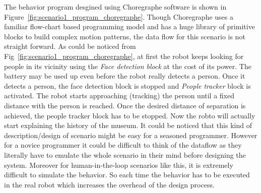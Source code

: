 The behavior program desgined using Choregraphe software is shown in Figure~\ref{fig:scenario1_program_choregraphe}. Though Choregraphe uses a familiar flow-chart based programming model and has a huge library of primitive blocks to build complex motion patterns, the data flow for this scenario is not straight forward. As could be noticed from Fig~\ref{fig:scenario1_program_choregraphe}, at first the robot keeps looking for people in its vicinity using the \emph{Face detection block} at the cost of its power. The battery may be used up even before the robot really detects a person. Once it detects a person, the face detection block is stopped and \emph{People tracker} block is activated. The robot starts approaching (tracking) the person until a fixed distance with the person is reached. Once the desired distance of separation is achieved, the people tracker block has to be stopped. Now the robto will actually start explaining the history of the museum. It could be noticed that this kind of description/design of scenario might be easy for a seasoned programmer. However for a novice programmer it could be difficult to think of the dataflow as they literally have to emulate the whole scenario in their mind before designing the system. Moreover for human-in-the-loop scenarios like this, it is extremely difficult to simulate the behavior. So each time the behavior has to be executed in the real robot which increases the overhead of the design process.


